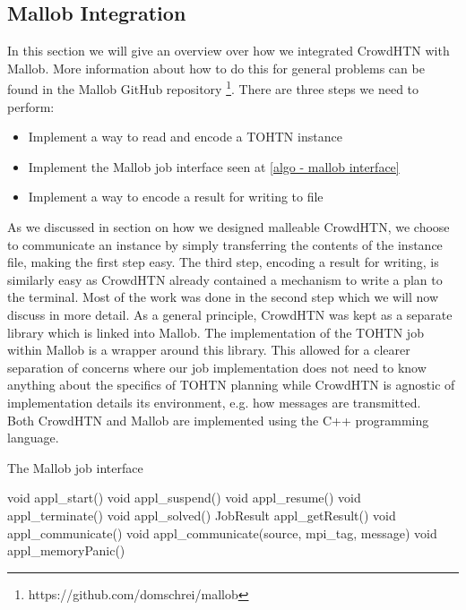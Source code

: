 \subsection{Mallob Integration}
In this section we will give an overview over how we integrated CrowdHTN with Mallob. More information about how to do this for general problems can be found in the Mallob GitHub repository \footnote{https://github.com/domschrei/mallob}. There are three steps we need to perform:
\begin{itemize}
	\item Implement a way to read and encode a TOHTN instance
	\item Implement the Mallob job interface seen at \ref{algo - mallob interface}
	\item Implement a way to encode a result for writing to file
\end{itemize}
As we discussed in section  on how we designed malleable CrowdHTN, we choose to communicate an instance by simply transferring the contents of the instance file, making the first step easy. The third step, encoding a result for writing, is similarly easy as CrowdHTN already contained a mechanism to write a plan to the terminal. Most of the work was done in the second step which we will now discuss in more detail. As a general principle, CrowdHTN was kept as a separate library which is linked into Mallob. The implementation of the TOHTN job within Mallob is a wrapper around this library. This allowed for a clearer separation of concerns where our job implementation does not need to know anything about the specifics of TOHTN planning while CrowdHTN is agnostic of implementation details its environment, e.g. how messages are transmitted.\\
Both CrowdHTN and Mallob are implemented using the C++ programming language.
\begin{algorithm}
	\caption{The Mallob job interface}
	\label{algo - mallob interface}
	void appl\_start()\;
	void appl\_suspend()\;
	void appl\_resume()\;
	void appl\_terminate()\;
	void appl\_solved()\;
	JobResult appl\_getResult()\;
	void appl\_communicate()\;
	void appl\_communicate(source, mpi\_tag, message)\;
	void appl\_memoryPanic()\;
\end{algorithm}

